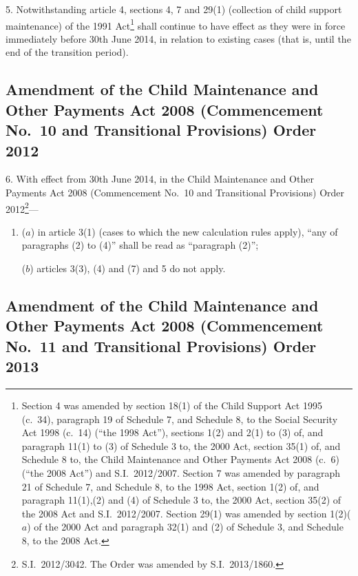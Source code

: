 \documentclass[12pt,a4paper]{article}
\begin{document}
5.  Notwithstanding article 4, sections 4, 7 and 29(1) (collection of child support maintenance) of the 1991 Act\footnote{Section 4 was amended by section 18(1) of the Child Support Act 1995 (c.~34), paragraph 19 of Schedule 7, and Schedule 8, to the Social Security Act 1998 (c.~14) (“the 1998 Act”), sections 1(2) and 2(1) to (3) of, and paragraph 11(1) to (3) of Schedule 3 to, the 2000 Act, section 35(1) of, and Schedule 8 to, the Child Maintenance and Other Payments Act 2008 (c.~6) (“the 2008 Act”) and S.I.~2012/2007. Section 7 was amended by paragraph 21 of Schedule 7, and Schedule 8, to the 1998 Act, section 1(2) of, and paragraph 11(1),(2) and (4) of Schedule 3 to, the 2000 Act, section 35(2) of the 2008 Act and S.I.~2012/2007. Section 29(1) was amended by section 1(2)($a$)  of the 2000 Act and paragraph 32(1) and (2) of Schedule 3, and Schedule 8, to the 2008 Act.} shall continue to have effect as they were in force immediately before 30th June 2014, in relation to existing cases (that is, until the end of the transition period).

\subsection[6. Amendment of the Child Maintenance and Other Payments Act 2008 (Commencement No.~10 and Transitional Provisions) Order 2012]{Amendment of the Child Maintenance and Other Payments Act 2008 (Commencement No.~10 and Transitional Provisions) Order 2012}

6.  With effect from 30th June 2014, in the Child Maintenance and Other Payments Act 2008 (Commencement No.~10 and Transitional Provisions) Order 2012\footnote{S.I.~2012/3042. The Order was amended by S.I.~2013/1860.}—
\begin{enumerate}\item[]
($a$) in article 3(1) (cases to which the new calculation rules apply), “any of paragraphs (2) to (4)” shall be read as “paragraph (2)”;

($b$) articles 3(3), (4) and (7) and 5 do not apply.
\end{enumerate}

\subsection[7. Amendment of the Child Maintenance and Other Payments Act 2008 (Commencement No.~11 and Transitional Provisions) Order 2013]{Amendment of the Child Maintenance and Other Payments Act 2008 (Commencement No.~11 and Transitional Provisions) Order 2013}
\end{document}
